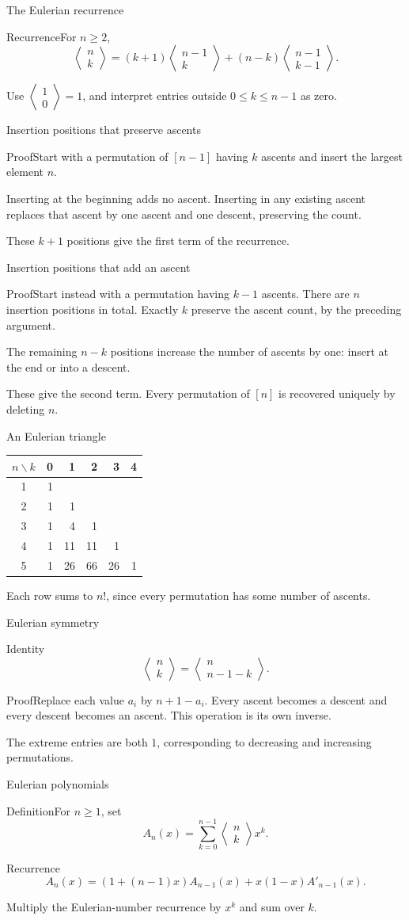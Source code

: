 \documentclass[aspectratio=169,11pt]{beamer}
\newcommand{\Def}[2]{\begin{block}{#1}#2\end{block}}
\newcommand{\Thm}[2]{\begin{block}{#1}#2\end{block}}
\renewcommand{\Proof}[1]{\begin{block}{Proof}\normalsize #1\end{block}}
\newcommand{\eul}[2]{\left\langle\begin{matrix}#1\\#2\end{matrix}\right\rangle}
\newcommand{\gap}{\par\medskip}
\begin{document}
\begin{frame}{The Eulerian recurrence}
\large
\Thm{Recurrence}{For $n\geq2$,
\[\eul nk=(k+1)\eul{n-1}k+(n-k)\eul{n-1}{k-1}.\]}
\gap Use $\eul10=1$, and interpret entries outside $0\leq k\leq n-1$ as zero.
\end{frame}
\begin{frame}{Insertion positions that preserve ascents}
\large
\Proof{Start with a permutation of $[n-1]$ having $k$ ascents and insert the largest element $n$.\gap Inserting at the beginning adds no ascent. Inserting in any existing ascent replaces that ascent by one ascent and one descent, preserving the count.\gap These $k+1$ positions give the first term of the recurrence.}
\end{frame}
\begin{frame}{Insertion positions that add an ascent}
\large
\Proof{Start instead with a permutation having $k-1$ ascents. There are $n$ insertion positions in total. Exactly $k$ preserve the ascent count, by the preceding argument.\gap The remaining $n-k$ positions increase the number of ascents by one: insert at the end or into a descent.\gap These give the second term. Every permutation of $[n]$ is recovered uniquely by deleting $n$.}
\end{frame}
\begin{frame}{An Eulerian triangle}
\large
\begin{center}\renewcommand{\arraystretch}{1.5}
\begin{tabular}{c|rrrrr}
$n\backslash k$&0&1&2&3&4\\\hline
1&1\\2&1&1\\3&1&4&1\\4&1&11&11&1\\5&1&26&66&26&1
\end{tabular}\end{center}
\gap Each row sums to $n!$, since every permutation has some number of ascents.
\end{frame}
\begin{frame}{Eulerian symmetry}
\large
\Thm{Identity}{\[\eul nk=\eul n{n-1-k}.\]}
\Proof{Replace each value $a_i$ by $n+1-a_i$. Every ascent becomes a descent and every descent becomes an ascent. This operation is its own inverse.}
\gap The extreme entries are both $1$, corresponding to decreasing and increasing permutations.
\end{frame}
\begin{frame}{Eulerian polynomials}
\large
\Def{Definition}{For $n\geq1$, set
\[A_n(x)=\sum_{k=0}^{n-1}\eul nkx^k.\]}
\Thm{Recurrence}{\[A_n(x)=(1+(n-1)x)A_{n-1}(x)+x(1-x)A'_{n-1}(x).\]}
\gap Multiply the Eulerian-number recurrence by $x^k$ and sum over $k$.
\end{frame}
\end{document}
